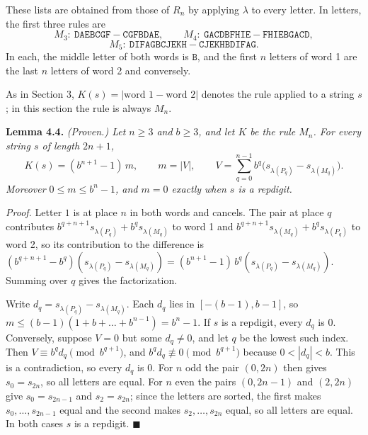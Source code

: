 \documentclass[11pt,letterpaper]{article}
\theoremstyle{paperstyle}
\theoremstyle{paperstyledef}
\theoremstyle{paperstylerem}
\begin{document}
These lists are obtained from those of \(R_n\) by applying \(\lambda\) to every letter. In letters, the first three rules are \[M_3:\ \mathtt{DAEBCGF} - \mathtt{CGFBDAE}, \qquad M_4:\ \mathtt{GACDBFHIE} - \mathtt{FHIEBGACD},\] \[M_5:\ \mathtt{DIFAGBCJEKH} - \mathtt{CJEKHBDIFAG}.\] In each, the middle letter of both words is \(\mathtt{B}\), and the first \(n\) letters of word 1 are the last \(n\) letters of word 2 and conversely.

As in Section 3, \(K(s) = \lvert \text{word 1} - \text{word 2} \rvert\) denotes the rule applied to a string \(s\); in this section the rule is always \(M_n\).

\textbf{Lemma 4.4.} \emph{(Proven.) Let \(n \geq 3\) and \(b \geq 3\), and let \(K\) be the rule \(M_n\). For every string \(s\) of length \(2n+1\),} \[K(s) = (b^{n+1} - 1)\, m, \qquad m = |V|, \qquad V = \sum_{q=0}^{n-1} b^q \bigl(s_{\lambda(P_q)} - s_{\lambda(M_q)}\bigr).\] \emph{Moreover \(0 \leq m \leq b^n - 1\), and \(m = 0\) exactly when \(s\) is a repdigit.}

\emph{Proof.} Letter \(1\) is at place \(n\) in both words and cancels. The pair at place \(q\) contributes \(b^{q+n+1} s_{\lambda(P_q)} + b^q s_{\lambda(M_q)}\) to word 1 and \(b^{q+n+1} s_{\lambda(M_q)} + b^q s_{\lambda(P_q)}\) to word 2, so its contribution to the difference is \((b^{q+n+1} - b^q)(s_{\lambda(P_q)} - s_{\lambda(M_q)}) = (b^{n+1} - 1)\, b^q (s_{\lambda(P_q)} - s_{\lambda(M_q)})\). Summing over \(q\) gives the factorization.

Write \(d_q = s_{\lambda(P_q)} - s_{\lambda(M_q)}\). Each \(d_q\) lies in \([-(b-1), b-1]\), so \(m \leq (b-1)(1 + b + \dots + b^{n-1}) = b^n - 1\). If \(s\) is a repdigit, every \(d_q\) is \(0\). Conversely, suppose \(V = 0\) but some \(d_q \neq 0\), and let \(q\) be the lowest such index. Then \(V \equiv b^q d_q \pmod{b^{q+1}}\), and \(b^q d_q \not\equiv 0 \pmod{b^{q+1}}\) because \(0 < |d_q| < b\). This is a contradiction, so every \(d_q\) is \(0\). For \(n\) odd the pair \((0, 2n)\) then gives \(s_0 = s_{2n}\), so all letters are equal. For \(n\) even the pairs \((0, 2n-1)\) and \((2, 2n)\) give \(s_0 = s_{2n-1}\) and \(s_2 = s_{2n}\); since the letters are sorted, the first makes \(s_0, \dots, s_{2n-1}\) equal and the second makes \(s_2, \dots, s_{2n}\) equal, so all letters are equal. In both cases \(s\) is a repdigit. \(\blacksquare\)
\end{document}
